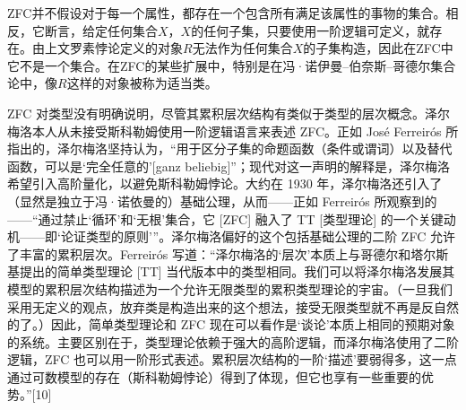 ZFC并不假设对于每一个属性，都存在一个包含所有满足该属性的事物的集合。相反，它断言，给定任何集合\(X\)，\(X\)的任何子集，只要使用一阶逻辑可定义，就存在。由上文罗素悖论定义的对象\(R\)无法作为任何集合\(X\)的子集构造，因此在ZFC中它不是一个集合。在ZFC的某些扩展中，特别是在冯·诺伊曼–伯奈斯–哥德尔集合论中，像\(R\)这样的对象被称为适当类。

ZFC 对类型没有明确说明，尽管其累积层次结构有类似于类型的层次概念。泽尔梅洛本人从未接受斯科勒姆使用一阶逻辑语言来表述 ZFC。正如 José Ferreirós 所指出的，泽尔梅洛坚持认为，“用于区分子集的命题函数（条件或谓词）以及替代函数，可以是‘完全任意的’[ganz beliebig]”；现代对这一声明的解释是，泽尔梅洛希望引入高阶量化，以避免斯科勒姆悖论。大约在 1930 年，泽尔梅洛还引入了（显然是独立于冯·诺依曼的）基础公理，从而——正如 Ferreirós 所观察到的——“通过禁止‘循环’和‘无根’集合，它 [ZFC] 融入了 TT [类型理论] 的一个关键动机——即‘论证类型的原则’”。泽尔梅洛偏好的这个包括基础公理的二阶 ZFC 允许了丰富的累积层次。Ferreirós 写道：“泽尔梅洛的‘层次’本质上与哥德尔和塔尔斯基提出的简单类型理论 [TT] 当代版本中的类型相同。我们可以将泽尔梅洛发展其模型的累积层次结构描述为一个允许无限类型的累积类型理论的宇宙。（一旦我们采用无定义的观点，放弃类是构造出来的这个想法，接受无限类型就不再是反自然的了。）因此，简单类型理论和 ZFC 现在可以看作是‘谈论’本质上相同的预期对象的系统。主要区别在于，类型理论依赖于强大的高阶逻辑，而泽尔梅洛使用了二阶逻辑，ZFC 也可以用一阶形式表述。累积层次结构的一阶‘描述’要弱得多，这一点通过可数模型的存在（斯科勒姆悖论）得到了体现，但它也享有一些重要的优势。”[10]